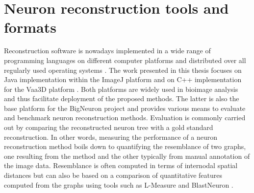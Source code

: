 \section{Neuron reconstruction tools and formats}
\label{sec:format}

Reconstruction software is nowadays implemented in a wide range of programming languages on different computer platforms and distributed over all regularly used operating systems \cite{meijering2010neuron, acciai2016automated}. The work presented in this thesis focuses on Java implementation within the ImageJ platform \cite{abramoff2004image, longair2011simple, pool2008neuritetracer} and on C++ implementation for the Vaa3D platform \cite{peng2014extensible}. Both platforms are widely used in bioimage analysis and thus facilitate deployment of the proposed methods. The latter is also the base platform for the BigNeuron project and provides various means to evaluate and benchmark neuron reconstruction methods. Evaluation is commonly carried out by comparing the reconstructed neuron tree with a gold standard reconstruction. In other words, measuring the performance of a neuron reconstruction method boils down to quantifying the resemblance of two graphs, one resulting from the method and the other typically from manual annotation of the image data. Resemblance is often computed in terms of internodal spatial distances but can also be based on a comparison of quantitative features computed from the graphs using tools such as L-Measure \cite{scorcioni2008measure} and BlastNeuron \cite{wan2015blastneuron}.

